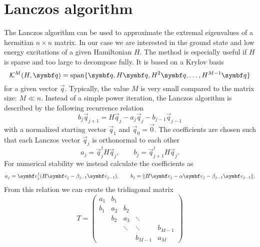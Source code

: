 \section{Lanczos algorithm}
\label{sec:lanczos-algorithm}

The Lanczos algorithm \cite{Lanczos1950} can be used to approximate the extremal eigenvalues
of a hermitian $n\times n$ matrix.
In our case we are interested in the ground state and low energy excitations of a
given Hamiltonian $H$.
The method is especially useful if $H$ is sparse and too large to decompose fully.
It is based on a Krylov basis
\begin{equation}
    \mathcal{K}^M(H, \vec{q}) = \spn\{\vec{q}, H\vec{q}, H^2\vec{q}, \ldots, H^{M-1}\vec{q}\}
\end{equation}
for a given vector $\vec{q}$.
Typically, the value $M$ is very small compared to the matrix size: $M \ll n$.
Instead of a simple power iteration, the Lanczos algorithm is described by the
following recurrence relation
\begin{equation}
    b_j\vec{q}_{j+1} = H\vec{q}_j - a_j\vec{q}_j - b_{j-1}\vec{q}_{j-1}
    \label{eq:Lanczos-recurrence}
\end{equation}
with a normalized starting vector $\vec{q}_1$ and $\vec{q}_0 = \vec{0}$.
The coefficients are chosen such that each Lanczos vector $\vec{q}_j$ is orthonormal to each other
\begin{equation}
    a_j = \vec{q}_j^\dag H \vec{q}_j,
    \qquad
    b_j = \vec{q}_{j+1}^\dag H \vec{q}_j.
\end{equation}
For numerical stability \cite{Paige1972, Paige1976}
we instead calculate the coefficients as
\begin{equation}
    a_j = \vec{v}_j^\dag(H \vec{v}_j - \beta_{j-1}\vec{v}_{j-1}),
    \qquad
    b_j = \norm{H\vec{v}_j - \alpha\vec{v}_j -  \beta_{j-1}\vec{v}_{j-1}}.
\end{equation}
From this relation we can create the tridiagonal matrix
\begin{equation}
    T
    =
    \begin{pmatrix}
        a_1 & b_1 &        &         &         \\
        b_1 & a_2 & b_2    &         &         \\
            & b_2 & a_3    & \ddots  &         \\
            &     & \ddots & \ddots  & b_{M-1} \\
            &     &        & b_{M-1} & a_M
    \end{pmatrix}
    \label{eq:tridiagonal-scalar}
\end{equation}
